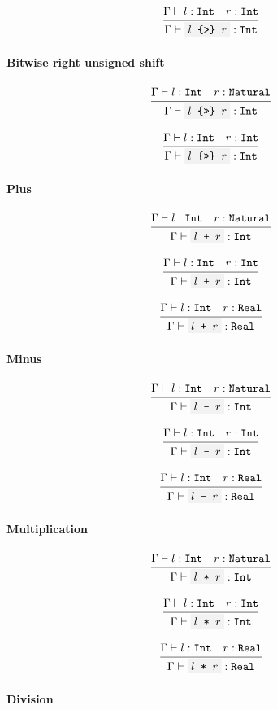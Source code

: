 \documentclass[11pt]{report}
\newcommand{\infrule}[3][gathered]{\frac{\begin{#1}#2\end{#1}}{\begin{gathered}#3\end{gathered}}}
\newcommand{\then}{\vdash}
\newcommand{\code}[1]{\texttt{\colorbox{gray!10}{#1}}}
\newcommand{\Int}{\texttt{Int}}
\newcommand{\Natural}{\texttt{Natural}}
\newcommand{\Real}{\texttt{Real}}
\newcommand{\Env}{\Gamma}
\theoremstyle{definition}
\begin{document}
\[
	\infrule{
		\Env\then l:\Int \quad r:\Int
	}{
		\Env\then \code{$l$ \{>\} $r$} : \Int
	}
\]

\paragraph{Bitwise right unsigned shift}

\[
	\infrule{
		\Env\then l:\Int \quad r:\Natural
	}{
		\Env\then \code{$l$ \{>>\} $r$} : \Int
	}
\]

\[
	\infrule{
		\Env\then l:\Int \quad r:\Int
	}{
		\Env\then \code{$l$ \{>>\} $r$} : \Int
	}
\]

\paragraph{Plus}

\[
	\infrule{
		\Env\then l:\Int \quad r:\Natural
	}{
		\Env\then \code{$l$ + $r$} : \Int
	}
\]

\[
	\infrule{
		\Env\then l:\Int \quad r:\Int
	}{
		\Env\then \code{$l$ + $r$} : \Int
	}
\]

\[
	\infrule{
		\Env\then l:\Int \quad r:\Real
	}{
		\Env\then \code{$l$ + $r$} : \Real
	}
\]

\paragraph{Minus}

\[
	\infrule{
		\Env\then l:\Int \quad r:\Natural
	}{
		\Env\then \code{$l$ - $r$} : \Int
	}
\]

\[
	\infrule{
		\Env\then l:\Int \quad r:\Int
	}{
		\Env\then \code{$l$ - $r$} : \Int
	}
\]

\[
	\infrule{
		\Env\then l:\Int \quad r:\Real
	}{
		\Env\then \code{$l$ - $r$} : \Real
	}
\]

\paragraph{Multiplication}

\[
	\infrule{
		\Env\then l:\Int \quad r:\Natural
	}{
		\Env\then \code{$l$ * $r$} : \Int
	}
\]

\[
	\infrule{
		\Env\then l:\Int \quad r:\Int
	}{
		\Env\then \code{$l$ * $r$} : \Int
	}
\]

\[
	\infrule{
		\Env\then l:\Int \quad r:\Real
	}{
		\Env\then \code{$l$ * $r$} : \Real
	}
\]

\paragraph{Division}
\end{document}
